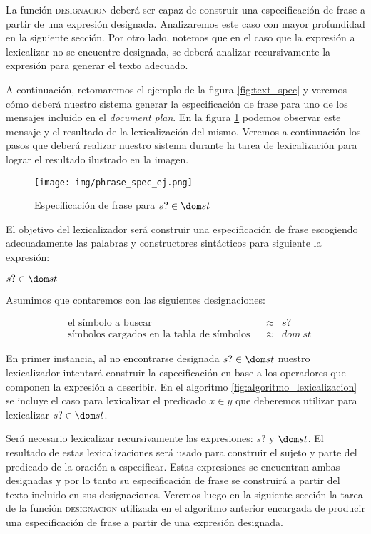 La función \textsc{designacion} deberá ser capaz de construir una especificación de frase a partir de una expresión designada. Analizaremos este caso con mayor profundidad en la siguiente sección. Por otro lado, notemos que en el caso que la expresión a lexicalizar no se encuentre designada, se deberá analizar recursivamente la expresión para generar el texto adecuado. 

A continuación, retomaremos el ejemplo de la figura \ref{fig:text_spec} y veremos cómo deberá nuestro sistema generar la especificación de frase para uno de los mensajes incluido en el \textit{document plan}. En la figura \ref{fig:phase_spec_ej} podemos observar este mensaje y el resultado de la lexicalización del mismo. Veremos a continuación los pasos que deberá realizar nuestro sistema durante la tarea de lexicalización para lograr el resultado ilustrado en la imagen.

\begin{figure}
  	\centering
	\texttt{[image: img/phrase\_spec\_ej.png]}
	\caption{Especificación de frase para $s? \protect\in \protect\dom st$}
  	\label{fig:phase_spec_ej}
\end{figure}

El objetivo del lexicalizador será construir una especificación de frase escogiendo adecuadamente las palabras y constructores sintácticos para siguiente la expresión:

\begin{center}
$s? \in \dom st$
\end{center}

\noindent
Asumimos que contaremos con las siguientes designaciones:

\begin{figure}[H]
\begin{align*} 
  &\text{el símbolo a buscar} && \approx &s? \\
  &\text{símbolos cargados en la tabla de símbolos} && \approx &dom~st 
\end{align*}
\end{figure}

En primer instancia, al no encontrarse designada $s? \in \dom st$ nuestro lexicalizador intentará construir la especificación en base a los operadores que componen la expresión a describir. En el algoritmo \ref{fig:algoritmo_lexicalizacion} se incluye el caso para lexicalizar el predicado $x \in y$ que deberemos utilizar para lexicalizar $s? \in \dom st$. 

Será necesario lexicalizar recursivamente las expresiones: $s?$ y $\dom st$. El resultado de estas lexicalizaciones será usado para construir el sujeto y parte del predicado de la oración a especificar. Estas expresiones se encuentran ambas designadas y por lo tanto su especificación de frase se construirá a partir del texto incluido en sus designaciones. Veremos luego en la siguiente sección la tarea de la función \textsc{designacion} utilizada en el algoritmo anterior encargada de producir una especificación de frase a partir de una expresión designada. 

